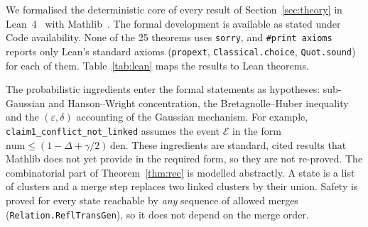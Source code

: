 We formalised the deterministic core of every result of Section~\ref{sec:theory} in Lean~4~\citep{moura2021lean4} with Mathlib~\citep{mathlib2020}. The formal development is available as stated under Code availability. None of the 25 theorems uses \texttt{sorry}, and \texttt{\#print axioms} reports only Lean's standard axioms (\texttt{propext}, \texttt{Classical.choice}, \texttt{Quot.sound}) for each of them. Table~\ref{tab:lean} maps the results to Lean theorems.

The probabilistic ingredients enter the formal statements as hypotheses: sub-Gaussian and Hanson--Wright concentration, the Bretagnolle--Huber inequality and the $(\varepsilon,\delta)$ accounting of the Gaussian mechanism. For example, \texttt{claim1\_conflict\_not\_linked} assumes the event $\mathcal E$ in the form $\mathrm{num}\le(1-\Delta+\gamma/2)\,\mathrm{den}$. These ingredients are standard, cited results that Mathlib does not yet provide in the required form, so they are not re-proved. The combinatorial part of Theorem~\ref{thm:rec} is modelled abstractly. A state is a list of clusters and a merge step replaces two linked clusters by their union. Safety is proved for every state reachable by \emph{any} sequence of allowed merges (\texttt{Relation.ReflTransGen}), so it does not depend on the merge order.

